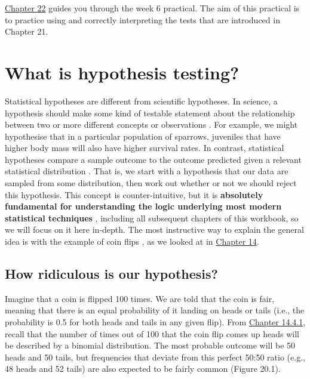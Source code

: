 \documentclass[
]{scrbook}
\begin{document}
\protect\hyperlink{Chapter_22}{Chapter 22} guides you through the week 6 practical. The aim of this practical is to practice using and correctly interpreting the tests that are introduced in Chapter 21.

\hypertarget{Chapter_20}{%
\chapter{What is hypothesis testing?}\label{Chapter_20}}

Statistical hypotheses are different from scientific hypotheses.
In science, a hypothesis should make some kind of testable statement about the relationship between two or more different concepts or observations \citep{Bouma2000}.
For example, we might hypothesise that in a particular population of sparrows, juveniles that have higher body mass will also have higher survival rates.
In contrast, statistical hypotheses compare a sample outcome to the outcome predicted given a relevant statistical distribution \citep{Sokal1995}.
That is, we start with a hypothesis that our data are sampled from some distribution, then work out whether or not we should reject this hypothesis.
This concept is counter-intuitive, but it is \textbf{absolutely fundamental for understanding the logic underlying most modern statistical techniques} \citep{Sokal1995, Mayo1996, Greenland2016}, including all subsequent chapters of this workbook, so we will focus on it here in-depth.
The most instructive way to explain the general idea is with the example of coin flips \citep{Mayo1996}, as we looked at in \protect\hyperlink{Chapter_14}{Chapter 14}.

\hypertarget{how-ridiculous-is-our-hypothesis}{%
\section{How ridiculous is our hypothesis?}\label{how-ridiculous-is-our-hypothesis}}

Imagine that a coin is flipped 100 times.
We are told that the coin is fair, meaning that there is an equal probability of it landing on heads or tails (i.e., the probability is 0.5 for both heads and tails in any given flip).
From \protect\hyperlink{Chapter_14.htmlux5cux23binomial-distribution}{Chapter 14.4.1}, recall that the number of times out of 100 that the coin flip comes up heads will be described by a binomial distribution.
The most probable outcome will be 50 heads and 50 tails, but frequencies that deviate from this perfect 50:50 ratio (e.g., 48 heads and 52 tails) are also expected to be fairly common (Figure 20.1).
\end{document}
